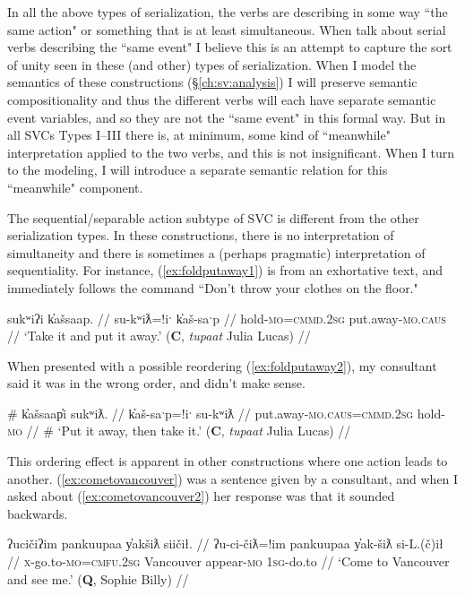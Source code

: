 In all the above types of serialization, the verbs are describing in some way ``the same action" or something that is at least simultaneous. When \citet{aikhenvalddixon2006} talk about serial verbs describing the ``same event" I believe this is an attempt to capture the sort of unity seen in these (and other) types of serialization. When I model the semantics of these constructions (\S\ref{ch:sv:analysis}) I will preserve semantic compositionality and thus the different verbs will each have separate semantic event variables, and so they are not the ``same event" in this formal way. But in all SVCs Types I--III there is, at minimum, some kind of ``meanwhile" interpretation applied to the two verbs, and this is not insignificant. When I turn to the modeling, I will introduce a separate semantic relation for this ``meanwhile" component.

The sequential/separable action subtype of SVC is different from the other serialization types. In these constructions, there is no interpretation of simultaneity and there is sometimes a (perhaps pragmatic) interpretation of sequentiality. For instance, (\ref{ex:foldputaway1}) is from an exhortative text, and immediately follows the command ``Don't throw your clothes on the floor."

\ex \label{ex:foldputaway1}
\begingl
\glpreamble sukʷiʔi k̓ašsaap. //
\gla su-kʷiƛ=!iˑ k̓aš-saˑp //
\glb hold-\textsc{mo}=\textsc{cmmd.2sg} put.away-\textsc{mo.caus} //
\glft `Take it and put it away.' (\textbf{C}, \textit{tupaat} Julia Lucas) //
\endgl
\xe

When presented with a possible reordering (\ref{ex:foldputaway2}), my consultant said it was in the wrong order, and didn't make sense.

\ex \label{ex:foldputaway2}
\begingl
\glpreamble \# k̓ašsaap̓i sukʷiƛ. //
\gla k̓aš-saˑp=!iˑ su-kʷiƛ //
\glb put.away-\textsc{mo.caus}=\textsc{cmmd.2sg} hold-\textsc{mo} //
\glft \# `Put it away, then take it.' (\textbf{C}, \textit{tupaat} Julia Lucas) //
\endgl
\xe

This ordering effect is apparent in other constructions where one action leads to another. (\ref{ex:cometovancouver}) was a sentence given by a consultant, and when I asked about (\ref{ex:cometovancouver2}) her response was that it sounded backwards.

\ex \label{ex:cometovancouver}
\begingl
\glpreamble ʔucičiʔim pankuupaa y̓akšiƛ siičił. //
\gla ʔu-ci-čiƛ=!im pankuupaa y̓ak-šiƛ si-L.(č)ił //
\glb \textsc{x}-go.to-\textsc{mo}=\textsc{cmfu.2sg} Vancouver appear-\textsc{mo} \textsc{1sg}-do.to //
\glft `Come to Vancouver and see me.' (\textbf{Q}, Sophie Billy) //
\endgl
\xe

